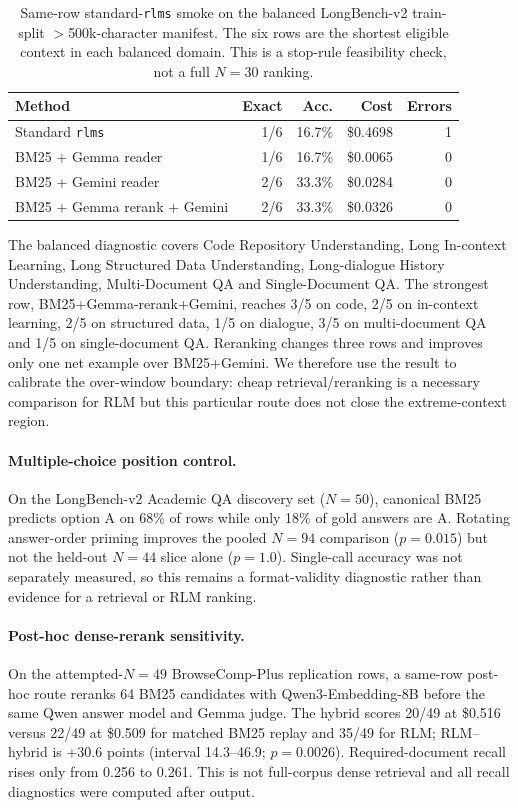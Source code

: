 \begin{table}[!t]
\centering
\small
\setlength{\tabcolsep}{4pt}
\begin{tabular}{@{}p{6.0cm}rrrr@{}}
\toprule
\textbf{Method} & \textbf{Exact} & \textbf{Acc.} & \textbf{Cost} & \textbf{Errors} \\
\midrule
Standard \texttt{rlms} & 1/6 & 16.7\% & \$0.4698 & 1 \\
BM25 + Gemma reader & 1/6 & 16.7\% & \$0.0065 & 0 \\
BM25 + Gemini reader & 2/6 & 33.3\% & \$0.0284 & 0 \\
BM25 + Gemma rerank + Gemini & 2/6 & 33.3\% & \$0.0326 & 0 \\
\bottomrule
\end{tabular}
\caption{Same-row standard-\texttt{rlms} smoke on the balanced LongBench-v2 train-split $>$500k-character manifest. The six rows are the shortest eligible context in each balanced domain. This is a stop-rule feasibility check, not a full $N=30$ ranking.}
\label{tab:supp-lb2-over500k-rlm-smoke}
\end{table}

The balanced diagnostic covers Code Repository Understanding, Long In-context Learning, Long Structured Data Understanding, Long-dialogue History Understanding, Multi-Document QA and Single-Document QA. The strongest row, BM25+Gemma-rerank+Gemini, reaches 3/5 on code, 2/5 on in-context learning, 2/5 on structured data, 1/5 on dialogue, 3/5 on multi-document QA and 1/5 on single-document QA. Reranking changes three rows and improves only one net example over BM25+Gemini. We therefore use the result to calibrate the over-window boundary: cheap retrieval/reranking is a necessary comparison for RLM but this particular route does not close the extreme-context region.

\paragraph{Multiple-choice position control.}
On the LongBench-v2 Academic QA discovery set ($N=50$), canonical BM25 predicts option A on 68\% of rows while only 18\% of gold answers are A. Rotating answer-order priming improves the pooled $N=94$ comparison ($p=0.015$) but not the held-out $N=44$ slice alone ($p=1.0$). Single-call accuracy was not separately measured, so this remains a format-validity diagnostic rather than evidence for a retrieval or RLM ranking.

\paragraph{Post-hoc dense-rerank sensitivity.}
On the attempted-$N=49$ BrowseComp-Plus replication rows, a same-row post-hoc route reranks 64 BM25 candidates with Qwen3-Embedding-8B before the same Qwen answer model and Gemma judge. The hybrid scores 20/49 at \$0.516 versus 22/49 at \$0.509 for matched BM25 replay and 35/49 for RLM; RLM--hybrid is +30.6 points (interval 14.3--46.9; $p=0.0026$). Required-document recall rises only from 0.256 to 0.261. This is not full-corpus dense retrieval and all recall diagnostics were computed after output.

